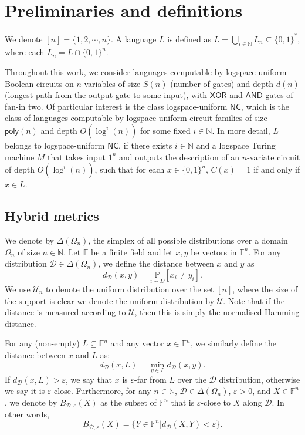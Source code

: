 \documentclass[11pt]{article}
\newcommand{\poly}{\mathsf{poly}}
\newcommand{\NC}{\mathsf{NC}}
\newcommand{\F}{\mathbb{F}}
\newcommand{\N}{\mathbb{N}}
\newcommand{\sU}{\mathcal{U}}
\newcommand{\sD}{\mathcal{D}}
\begin{document}
\section{Preliminaries and definitions}

We denote $[n]=\{1,2,\cdots, n\}$. A language $L$ is defined as $L=\bigcup_{i\in \mathbb{N}}L_{n} \subseteq \{0,1\}^*$, where each $L_n = L \cap \{0,1\}^n$.

Throughout this work, we consider languages computable by logspace-uniform Boolean circuits on $n$ variables of size $S(n)$ (number of gates) and depth $d(n)$ (longest path from the output gate to some input), with $\mathsf{XOR}$ and $\mathsf{AND}$ gates of fan-in two. Of particular interest is the class logspace-uniform $\NC$, which is the class of languages computable by logspace-uniform circuit families of size $\poly(n)$ and depth $O(\log^i (n))$ for some fixed $i\in \N$. In more detail, $L$ belongs to logspace-uniform $\NC$, if there exists $i\in \N$ and a logspace Turing machine $M$ that takes input $1^n$ and outputs the description of an $n$-variate circuit of depth $O(\log^i (n))$, such that for each $x \in \{0,1\}^n$, $C(x) = 1$ if and only if $x \in L$. 

\subsection{Hybrid metrics}
We denote by $\Delta(\Omega_{n})$, the simplex of all possible distributions over a domain $\Omega_{n}$ of size $n\in \mathbb{N}$. Let $\mathbb{F}$ be a finite field and let $x,y$ be vectors in $\mathbb{F}^n$. For any distribution $\mathcal{D}\in \Delta(\Omega_n)$, we define the distance between $x$ and $y$ as
\begin{equation*}
d_{\mathcal{D}}(x,y)=\underset{i\sim D}{\mathbb{P}}\left[x_{i}\neq y_{i}\right].
\end{equation*}
We use $\mathcal{U}_{n}$ to denote the uniform distribution over the set $[n]$, where the size of the support is clear we denote the uniform distribution by $\mathcal{U}$. Note that if the distance is measured according to $\sU$, then this is simply the normalised Hamming distance. 

For any (non-empty) $L\subseteq \mathbb{F}^{n}$ and any vector $x \in \mathbb{F}^{n}$, we similarly define the distance between $x$ and $L$ as:
\begin{equation*}
d_{\mathcal{D}}(x,L)=\min\limits_{y\in L}d_{\mathcal{D}}(x,y).
\end{equation*}
If $d_{\mathcal{D}}(x,L)>\varepsilon$, we say that $x$ is $\varepsilon$-far from $L$ over the $\mathcal{D}$ distribution, otherwise we say it is $\varepsilon$-close. Furthermore, for any $n\in \N$, $\sD\in\Delta(\Omega_{n})$, $\varepsilon>0$, and $X\in \F^{n}$, we denote by $B_{\mathcal{D},\varepsilon}(X)$ as the subset of $\F^n$ that is $\varepsilon$-close to $X$ along $\sD$. In other words,
\begin{equation}
    B_{\sD,\varepsilon}(X)=\{Y\in \F^{n}\vert d_{\sD}(X,Y)<\varepsilon\}.
\end{equation}
\end{document}
